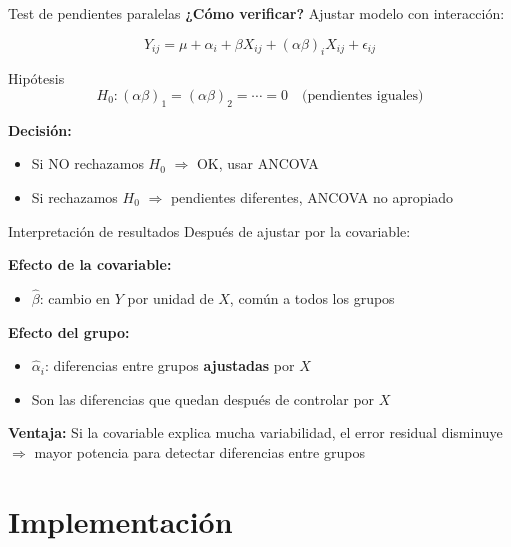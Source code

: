 \documentclass[aspectratio=169]{beamer}
\begin{document}
\begin{frame}{Test de pendientes paralelas}
\textbf{¿Cómo verificar?} Ajustar modelo con interacción:

\[
Y_{ij} = \mu + \alpha_i + \beta X_{ij} + (\alpha\beta)_i X_{ij} + \epsilon_{ij}
\]

\vspace{0.3cm}
\begin{block}{Hipótesis}
\[
H_0: (\alpha\beta)_1 = (\alpha\beta)_2 = \cdots = 0 \quad \text{(pendientes iguales)}
\]
\end{block}

\vspace{0.3cm}
\textbf{Decisión:}
\begin{itemize}
    \item Si NO rechazamos $H_0$ $\Rightarrow$ OK, usar ANCOVA
    \item Si rechazamos $H_0$ $\Rightarrow$ pendientes diferentes, ANCOVA no apropiado
\end{itemize}
\end{frame}

\begin{frame}{Interpretación de resultados}
Después de ajustar por la covariable:

\vspace{0.3cm}
\textbf{Efecto de la covariable:}
\begin{itemize}
    \item $\hat{\beta}$: cambio en $Y$ por unidad de $X$, común a todos los grupos
\end{itemize}

\vspace{0.3cm}
\textbf{Efecto del grupo:}
\begin{itemize}
    \item $\hat{\alpha}_i$: diferencias entre grupos \textbf{ajustadas} por $X$
    \item Son las diferencias que quedan después de controlar por $X$
\end{itemize}

\vspace{0.5cm}
\textbf{Ventaja:} Si la covariable explica mucha variabilidad, el error residual disminuye $\Rightarrow$ mayor potencia para detectar diferencias entre grupos
\end{frame}

\section{Implementación}
\end{document}
